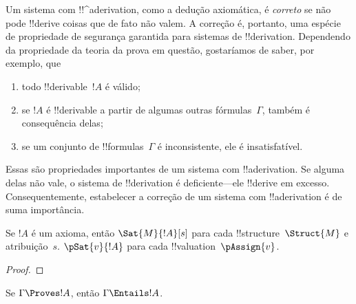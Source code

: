 \documentclass[../../../include/open-logic-section]{subfiles}
\begin{document}
      {}
      {}
      

\begin{explain}
Um sistema com !!^a{derivation}, como a dedução axiomática, é \emph{correto}
se não pode !!{derive} coisas que de fato não valem. A correção é,
portanto, uma espécie de propriedade de segurança garantida para
sistemas de !!{derivation}. Dependendo da propriedade da teoria da
prova em questão, gostaríamos de saber, por exemplo, que
\begin{enumerate}
\item todo !!{derivable}~$!A$ é válido;
\item se $!A$ é !!{derivable} a partir de algumas outras
  fórmulas~$\Gamma$, também é consequência delas;
\item se um conjunto de !!{formula}s~$\Gamma$ é inconsistente, ele é
  insatisfatível.
\end{enumerate}
Essas são propriedades importantes de um sistema com !!a{derivation}. Se
alguma delas não vale, o sistema de !!{derivation} é deficiente---ele
!!{derive} em excesso. Consequentemente, estabelecer a correção de
um sistema com !!a{derivation} é de suma importância.
\end{explain}

\begin{prop}
  Se $!A$ é um axioma, então
    {$\Sat{M}{!A}[s]$ para cada !!{structure}~$\Struct{M}$ e atribuição~$s$.}
    {$\pSat{v}{!A}$ para cada !!{valuation}~$\pAssign{v}$.}
\end{prop}

\begin{proof}
\end{proof}

\begin{thm}[Correção]
Se $\Gamma \Proves !A$, então $\Gamma \Entails !A$.
\end{thm}
\end{document}
